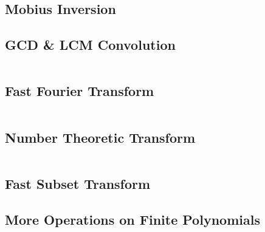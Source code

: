 \subsection{Mobius Inversion}
\subsection{GCD \& LCM Convolution}

\hrulefill \vspace{-\baselineskip}
\begin{multicols}{2}
\inputminted[autogobble,fontsize=\tiny]{C++}{Maths/gcd_convolution.cpp}
\end{multicols}
\vspace{-\baselineskip}
\noindent \hrulefill

\subsection{Fast Fourier Transform}

\hrulefill \vspace{-\baselineskip}
\begin{multicols}{2}
\inputminted[autogobble,fontsize=\tiny]{C++}{Maths/fft.cpp}
\end{multicols}
\vspace{-\baselineskip}
\noindent \hrulefill

\subsection{Number Theoretic Transform}

\hrulefill \vspace{-\baselineskip}
\begin{multicols}{2}
\inputminted[autogobble,fontsize=\tiny]{C++}{Maths/ntt.cpp}
\end{multicols}
\vspace{-\baselineskip}
\noindent \hrulefill

\subsection{Fast Subset Transform}
\subsection{More Operations on Finite Polynomials}

\hrulefill \vspace{-\baselineskip}
\begin{multicols}{2}
\inputminted[autogobble,fontsize=\tiny]{C++}{Maths/poly.cpp}
\end{multicols}
\vspace{-\baselineskip}
\noindent \hrulefill

